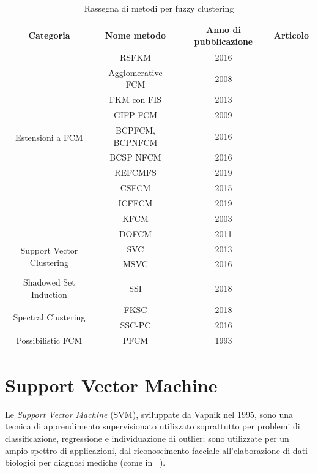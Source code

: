\documentclass[oneside, openany]{book}
\begin{document}
		\begin{table}[h!]
			\caption{Rassegna di metodi per fuzzy clustering}
			\begin{center}\begin{tabular}{ |c|c|c|c| } 
					\hline
					Categoria & Nome metodo & Anno di pubblicazione & Articolo\\
					\hline
					\multirow{10}{4em}{Estensioni a FCM} 
					& RSFKM & 2016 & \cite{bib:rsfkm}\\ 
					& Agglomerative FCM & 2008 & \cite{bib:afkm}\\
					& FKM con FIS & 2013 & \cite{bib:fkmfis}\\ 
					& GIFP-FCM & 2009 & \cite{bib:gifpfcm}\\
					& BCPFCM, BCPNFCM & 2016 & \cite{bib:bcpfcm}\\
					& BCSP NFCM & 2016 & \cite{bib:bcpfcm}\\
					& REFCMFS & 2019 & \cite{bib:refcmfs}\\ 
					& CSFCM & 2015 & \cite{bib:csfcm}\\
					& ICFFCM & 2019 &\cite{bib:icffcm}\\
					& KFCM & 2003 &\cite{bib:kfcm}\\
					& DOFCM & 2011 & \cite{bib:dofcm}\\
					\hline													
					\multirow{2}{4em}{Support Vector Clustering}	& SVC & 2013 & \cite{bib:svc}\\ 
					& MSVC & 2016 & \cite{bib:msvc}\\ 
					&  &  & \\
					\hline
					\multirow{3}{4em}{Shadowed Set Induction} & & & \\
					& SSI & 2018 & \cite{bib:ssi}\\
					& & & \\	
					\hline
					\multirow{2}{4em}{Spectral Clustering}	& FKSC & 2018 & \cite{bib:fksc}\\ 
					& SSC-PC & 2016 & \cite{bib:sscpc}\\ 
					\hline
					Possibilistic FCM & PFCM & 1993 & \cite{bib:pfcm}\\
					\hline
				\end{tabular}
			\end{center}
			\label{tab:clustering}	
		\end{table}
	
	\section{Support Vector Machine}
	Le \textit{Support Vector Machine} (SVM), sviluppate da Vapnik nel 1995, sono una tecnica di apprendimento supervisionato utilizzato soprattutto per problemi di classificazione, regressione e individuazione di outlier;  sono utilizzate per un ampio spettro di applicazioni, dal riconoscimento facciale \cite{bib:svmfr, bib:svmfr2} all'elaborazione di dati biologici per diagnosi mediche (come in ~\cite{bib:svmmed,bib:svmmed2}).
	
\end{document}
